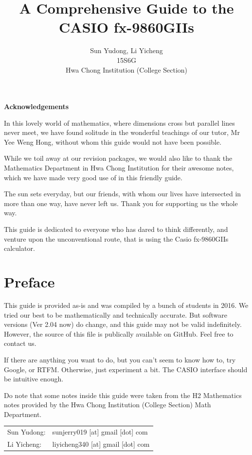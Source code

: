 \documentclass[a5paper]{memoir}
\title{A Comprehensive Guide to the CASIO fx-9860GIIs}
\author{Sun Yudong, Li Yicheng \\ 15S6G \\ Hwa Chong Institution (College Section)}
\newenvironment{acknowledgements}%
{\cleardoublepage\thispagestyle{empty}\null\vfill\begin{center}%
		\bfseries Acknowledgements\end{center}}%
{\vfill\cleardoublepage\null}
\begin{document}
\begin{titlingpage}
	\maketitle
\end{titlingpage}

\frontmatter

\begin{acknowledgements}
	In this lovely world of mathematics, where dimensions cross but parallel lines never meet, we have found solitude in the wonderful teachings of our tutor, Mr Yee Weng Hong, without whom this guide would not have been possible. 
	
	While we toil away at our revision packages, we would also like to thank the Mathematics Department in Hwa Chong Institution for their awesome notes, which we have made very good use of in this friendly guide.
	
	The sun sets everyday, but our friends, with whom our lives have intersected in more than one way, have never left us. Thank you for supporting us the whole way.
	
	This guide is dedicated to everyone who has dared to think differently, and venture upon the unconventional route, that is using the Casio fx-9860GIIs calculator.	
\end{acknowledgements}

\tableofcontents

\chapter{Preface}
This guide is provided as-is and was compiled by a bunch of students in 2016. We tried our best to be mathematically and technically accurate. But software versions (Ver 2.04 now) do change, and this guide may not be valid indefinitely. However, the source of this file is publically available on GitHub. Feel free to contact us.

If there are anything you want to do, but you can't seem to know how to, try Google, or RTFM. Otherwise, just experiment a bit. The CASIO interface should be intuitive enough.

Do note that some notes inside this guide were taken from the H2 Mathematics notes provided by the Hwa Chong Institution (College Section) Math Department. 

\vspace{0.7cm}

\begin{tabular}{l l}
	Sun Yudong: & sunjerry019 [at] gmail [dot] com \\
	Li Yicheng: & liyicheng340 [at] gmail [dot] com 
\end{tabular}
\end{document}
